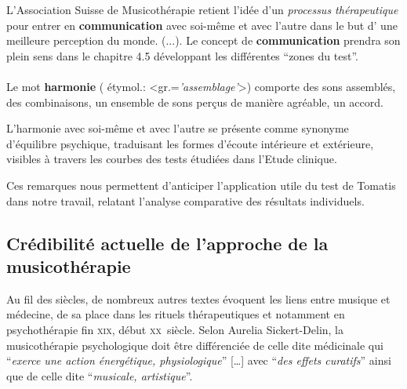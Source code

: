 L'Association Suisse
de Musicothérapie retient l'idée d'un\textit{ processus thérapeutique }pour entrer en \textbf{communication} avec soi-même et avec 
l'autre dans le but d' une meilleure perception du
monde. (...)\autocite{site_musitherapy}.
Le concept de \textbf{communication} prendra son plein sens 
dans le chapitre 4.5 développant les différentes ``zones du test''.
\paragraph{}
Le mot \textbf{harmonie} ( étymol.:
<gr.=\textit{'assemblage'}>) comporte 
 des sons assemblés, des combinaisons, un ensemble de sons perçus de
 manière agréable, un accord.
 
 L'harmonie avec soi-même et avec l'autre se présente comme  synonyme d'équilibre
psychique, traduisant les formes d'écoute intérieure et
extérieure,  visibles à travers les courbes des tests étudiées
dans l'Etude clinique.



Ces remarques nous permettent d'anticiper
l'application utile du test de Tomatis dans notre travail, relatant l'analyse
comparative des résultats individuels.

 
\subsection{Crédibilité actuelle de l'approche de la musicothérapie }


Au fil des siècles, de nombreux autres 
textes évoquent les liens entre musique et médecine, de sa place dans les 
rituels thérapeutiques et notamment en psychothérapie fin \textsc{xix}\ieme, 
début \textsc{xx}\ieme\ siècle.
Selon Aurelia Sickert-Delin, la musicothérapie 
psychologique doit être différenciée de celle dite médicinale qui 
\enquote{\emph{exerce une action 
énergétique, physiologique}} [\dots] avec \enquote{\emph{des effets curatifs}}  
ainsi que de celle dite \enquote{\emph{musicale, artistique}}. 


